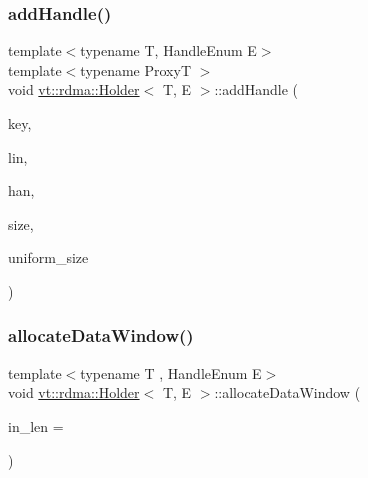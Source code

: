 \mbox{\label{structvt_1_1rdma_1_1_holder_ab5feb3bca7aad2b37c7249f3abf7ab05}} 
\subsubsection{\texorpdfstring{add\+Handle()}{addHandle()}\hspace{0.1cm}{\footnotesize\ttfamily [2/2]}}
{\footnotesize\ttfamily template$<$typename T, Handle\+Enum E$>$ \\
template$<$typename ProxyT $>$ \\
void \hyperlink{structvt_1_1rdma_1_1_holder}{vt\+::rdma\+::\+Holder}$<$ T, E $>$\+::add\+Handle (\begin{DoxyParamCaption}\item[{\hyperlink{structvt_1_1rdma_1_1_handle_key}{Handle\+Key}}]{key,  }\item[{\hyperlink{namespacevt_1_1rdma_a38e310504e675aa1bcaf7811019b0df2}{Elem\+Type}}]{lin,  }\item[{\hyperlink{structvt_1_1rdma_1_1_handle}{Handle}$<$ T, E $>$}]{han,  }\item[{std\+::size\+\_\+t}]{size,  }\item[{bool}]{uniform\+\_\+size }\end{DoxyParamCaption})\hspace{0.3cm}{\ttfamily [private]}}

\mbox{\label{structvt_1_1rdma_1_1_holder_a7dc5e735fb6f919dabec8e118683b4ae}} 
\subsubsection{\texorpdfstring{allocate\+Data\+Window()}{allocateDataWindow()}}
{\footnotesize\ttfamily template$<$typename T , Handle\+Enum E$>$ \\
void \hyperlink{structvt_1_1rdma_1_1_holder}{vt\+::rdma\+::\+Holder}$<$ T, E $>$\+::allocate\+Data\+Window (\begin{DoxyParamCaption}\item[{std\+::size\+\_\+t const}]{in\+\_\+len = {} }\end{DoxyParamCaption})\hspace{0.3cm}{\ttfamily [private]}}


